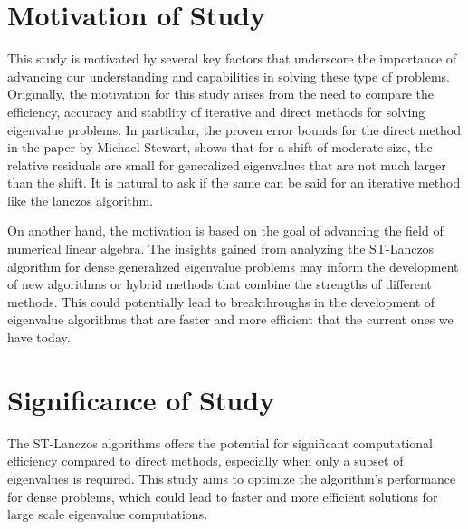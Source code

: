 \section{Motivation of Study}

This study is motivated by several key factors that underscore the importance of advancing our understanding and capabilities in solving these type of problems. Originally, the motivation for this study arises from the need to compare the efficiency, accuracy and stability of iterative and direct methods for solving eigenvalue problems. In particular, the proven error bounds for the direct method in the paper by Michael Stewart, shows that for a shift of moderate size, the relative residuals are small for generalized eigenvalues that are not much larger than the shift. It is natural to ask if the same can be said for an iterative method like the lanczos algorithm.\par
On another hand, the motivation is based on the goal of advancing the field of numerical linear algebra. The insights gained from analyzing the ST-Lanczos algorithm for dense generalized eigenvalue problems may inform the development of new algorithms or hybrid methods that combine the strengths of different methods. This could potentially lead to breakthroughs in the development of eigenvalue algorithms that are faster and more efficient that the current ones we have today.\\
\section{Significance of Study}
The ST-Lanczos algorithms offers the potential for significant computational efficiency compared to direct methods, especially when only a subset of eigenvalues is required. This study aims to optimize the algorithm's performance for dense problems, which could lead to faster and more efficient solutions for large scale eigenvalue computations.